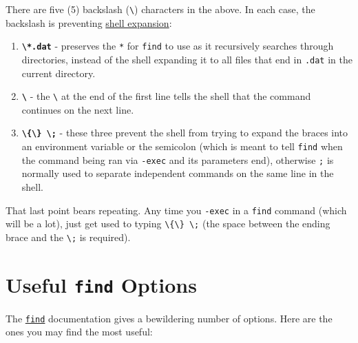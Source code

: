\documentclass[10pt,]{book}
\numberwithin{figure}{chapter}
\begin{document}
There are five (5) backslash (\texttt{\textbackslash{}}) characters in
the above. In each case, the backslash is preventing
\href{http://www.tldp.org/LDP/Bash-Beginners-Guide/html/sect_03_04.html}{shell
expansion}:

\begin{enumerate}
\def\labelenumi{\arabic{enumi}.}
\item
  \textbf{\texttt{\textbackslash{}*.dat}} - preserves the \texttt{*} for
  \texttt{find} to use as it recursively searches through directories,
  instead of the shell expanding it to all files that end in
  \texttt{.dat} in the current directory.
\item
  \textbf{\texttt{\textbackslash{}}} - the \texttt{\textbackslash{}} at
  the end of the first line tells the shell that the command continues
  on the next line.
\item
  \textbf{\texttt{\textbackslash{}\{\textbackslash{}\} \textbackslash{};}}
  - these three prevent the shell from trying to expand the braces into
  an environment variable or the semicolon (which is meant to tell
  \texttt{find} when the command being ran via \texttt{-exec} and its
  parameters end), otherwise \texttt{;} is normally used to separate
  independent commands on the same line in the shell.
\end{enumerate}

That last point bears repeating. Any time you \texttt{-exec} in a
\texttt{find} command (which will be a lot), just get used to typing
\texttt{\textbackslash{}\{\textbackslash{}\} \textbackslash{};} (the
space between the ending brace and the \texttt{\textbackslash{};} is
required).

\section{Useful \texttt{find} Options}\label{useful-find-options}

The \href{http://linux.die.net/man/1/find}{\texttt{find}} documentation
gives a bewildering number of options. Here are the ones you may find
the most useful:
\end{document}
